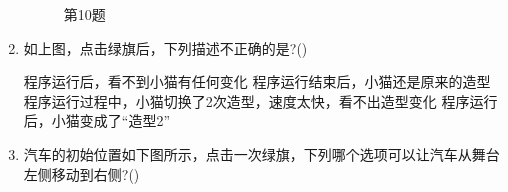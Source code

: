 \documentclass[10pt, a4paper]{article}
\begin{document}
\begin{enumerate}
\begin{figure}[htbp]
\begin{minipage}[t]{.48\textwidth}
\begin{minipage}{.25\textwidth}
                \end{minipage}
                \caption*{第10题}
            \end{minipage}
        \end{figure}

        \item 如上图，点击绿旗后，下列描述不正确的是?(\qquad)
        \begin{tasks}
            \task 程序运行后，看不到小猫有任何变化
            \task 程序运行结束后，小猫还是原来的造型
            \task 程序运行过程中，小猫切换了2次造型，速度太快，看不出造型变化
            \task 程序运行后，小猫变成了“造型2”
        \end{tasks}

        \item 汽车的初始位置如下图所示，点击一次绿旗，下列哪个选项可以让汽车从舞台左侧移动到右侧?(\qquad)
        

\end{enumerate}
\end{document}
